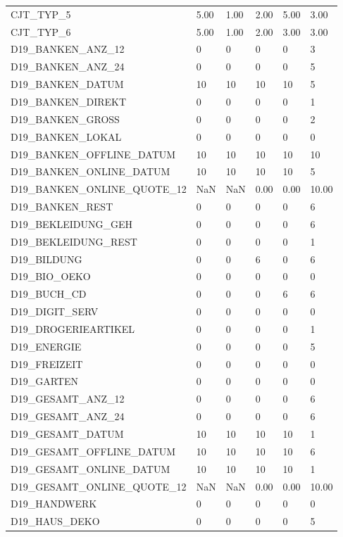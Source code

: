 \begin{longtable}{lp{1cm}p{1cm}p{1cm}p{1cm}p{1cm}}
CJT\_TYP\_5 &   5.00 & 1.00 & 2.00 & 5.00 & 3.00 \\
CJT\_TYP\_6 &   5.00 & 1.00 & 2.00 & 3.00 & 3.00 \\
D19\_BANKEN\_ANZ\_12  & 0 & 0 & 0 & 0 & 3 \\
D19\_BANKEN\_ANZ\_24  & 0 & 0 & 0 & 0 & 5 \\
D19\_BANKEN\_DATUM   &  10 & 10 & 10 & 10 & 5 \\
D19\_BANKEN\_DIREKT  & 0 & 0 & 0 & 0 & 1 \\
D19\_BANKEN\_GROSS   & 0 & 0 & 0 & 0 & 2 \\
D19\_BANKEN\_LOKAL   & 0 & 0 & 0 & 0 & 0 \\
D19\_BANKEN\_OFFLINE\_DATUM  &  10 & 10 & 10 & 10 & 10 \\
D19\_BANKEN\_ONLINE\_DATUM   &  10 & 10 & 10 & 10 & 5 \\
D19\_BANKEN\_ONLINE\_QUOTE\_12  & NaN & NaN & 0.00 & 0.00 &  10.00 \\
D19\_BANKEN\_REST  & 0 & 0 & 0 & 0 & 6 \\
D19\_BEKLEIDUNG\_GEH & 0 & 0 & 0 & 0 & 6 \\
D19\_BEKLEIDUNG\_REST  & 0 & 0 & 0 & 0 & 1 \\
D19\_BILDUNG & 0 & 0 & 6 & 0 & 6 \\
D19\_BIO\_OEKO  & 0 & 0 & 0 & 0 & 0 \\
D19\_BUCH\_CD & 0 & 0 & 0 & 6 & 6 \\
D19\_DIGIT\_SERV   & 0 & 0 & 0 & 0 & 0 \\
D19\_DROGERIEARTIKEL  & 0 & 0 & 0 & 0 & 1 \\
D19\_ENERGIE & 0 & 0 & 0 & 0 & 5 \\
D19\_FREIZEIT  & 0 & 0 & 0 & 0 & 0 \\
D19\_GARTEN & 0 & 0 & 0 & 0 & 0 \\
D19\_GESAMT\_ANZ\_12  & 0 & 0 & 0 & 0 & 6 \\
D19\_GESAMT\_ANZ\_24  & 0 & 0 & 0 & 0 & 6 \\
D19\_GESAMT\_DATUM   &  10 & 10 & 10 & 10 & 1 \\
D19\_GESAMT\_OFFLINE\_DATUM  &  10 & 10 & 10 & 10 & 6 \\
D19\_GESAMT\_ONLINE\_DATUM   &  10 & 10 & 10 & 10 & 1 \\
D19\_GESAMT\_ONLINE\_QUOTE\_12  & NaN & NaN & 0.00 & 0.00 &  10.00 \\
D19\_HANDWERK  & 0 & 0 & 0 & 0 & 0 \\
D19\_HAUS\_DEKO    & 0 & 0 & 0 & 0 & 5 \\

\end{longtable}

